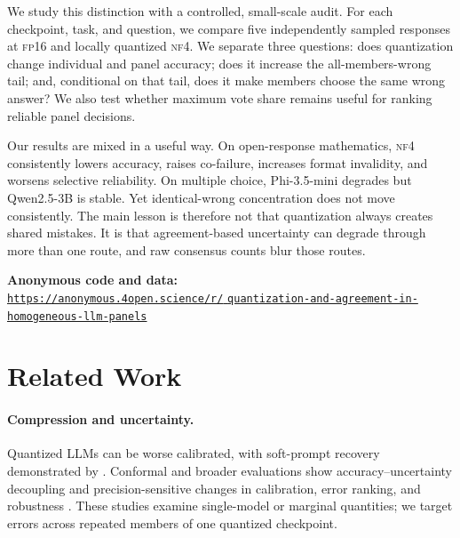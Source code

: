 \documentclass[11pt]{article}
\newcommand{\nf}{\textsc{nf4}}
\newcommand{\fp}{\textsc{fp16}}
\begin{document}
We study this distinction with a controlled, small-scale audit. For each checkpoint, task, and question, we compare five independently sampled responses at \fp{} and locally quantized \nf{}. We separate three questions: does quantization change individual and panel accuracy; does it increase the all-members-wrong tail; and, conditional on that tail, does it make members choose the same wrong answer? We also test whether maximum vote share remains useful for ranking reliable panel decisions.

Our results are mixed in a useful way. On open-response mathematics, \nf{} consistently lowers accuracy, raises co-failure, increases format invalidity, and worsens selective reliability. On multiple choice, Phi-3.5-mini degrades but Qwen2.5-3B is stable. Yet identical-wrong concentration does not move consistently. The main lesson is therefore not that quantization always creates shared mistakes. It is that agreement-based uncertainty can degrade through more than one route, and raw consensus counts blur those routes.

\noindent\textbf{Anonymous code and data:}\\[-1pt]
\href{https://anonymous.4open.science/r/quantization-and-agreement-in-homogeneous-llm-panels}{\textcolor{artifactblue}{%
\nolinkurl{https://anonymous.4open.science/r/}\allowbreak%
\nolinkurl{quantization-and-agreement-in-}\allowbreak%
\nolinkurl{homogeneous-llm-panels}}}

\section{Related Work}

\paragraph{Compression and uncertainty.}
Quantized LLMs can be worse calibrated, with soft-prompt recovery demonstrated by \citet{zhong-etal-2025-quantized}. Conformal and broader evaluations show accuracy--uncertainty decoupling and precision-sensitive changes in calibration, error ranking, and robustness \citep{tong2026compression,tao2025revisiting,ayadi2026reliability}. These studies examine single-model or marginal quantities; we target errors across repeated members of one quantized checkpoint.
\end{document}
